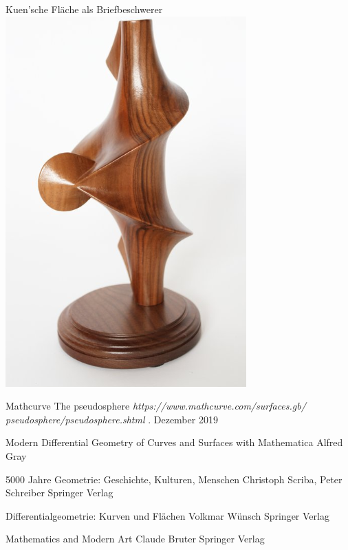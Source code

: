 \documentclass[12pt]{beamer}
\begin{document}
\begin{frame}{Kuen'sche Fläche als Briefbeschwerer}
\centering
\includegraphics[scale=0.5]{kuen_letter.png}
\end{frame}

\begin{frame}
\footnotesize{
\begin{thebibliography}{99}

 Mathcurve
\newblock The pseudosphere
\newblock \emph{https://www.mathcurve.com/surfaces.gb/\\pseudosphere/pseudosphere.shtml}
. Dezember 2019

 Modern Differential Geometry of Curves and Surfaces with Mathematica
\newblock Alfred Gray

\end{thebibliography}
}

\end{frame}

\begin{frame}
\footnotesize{
\begin{thebibliography}{99}

 5000 Jahre Geometrie: Geschichte, Kulturen, Menschen
\newblock Christoph Scriba, Peter Schreiber
\newblock Springer Verlag

 Differentialgeometrie: Kurven und Flächen
\newblock Volkmar Wünsch
\newblock Springer Verlag

\end{thebibliography}
}
\end{frame}

\begin{frame}
\footnotesize{
\begin{thebibliography}{99}

 Mathematics and Modern Art
\newblock Claude Bruter
\newblock Springer Verlag

\end{thebibliography}
}
\end{frame}
\end{document}
